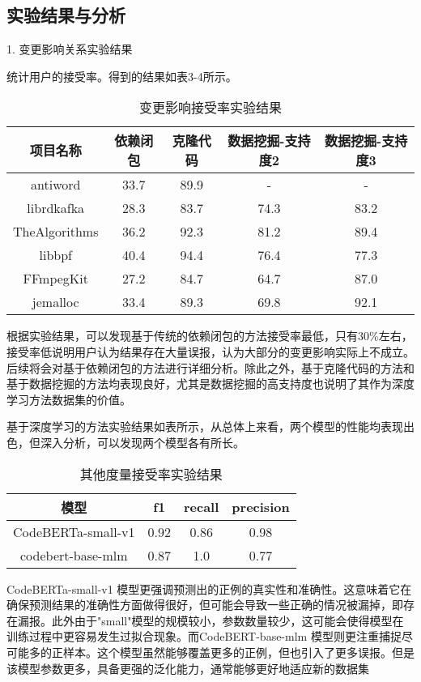 \subsection{实验结果与分析}

1. 变更影响关系实验结果

统计用户的接受率。得到的结果如表3-4所示。

\begin{table}[htbp]
\caption{变更影响接受率实验结果}
\vspace{0.5em}\centering\wuhao
\begin{tabular}{ccccc}
\toprule
项目名称 & 依赖闭包 & 克隆代码 & 数据挖掘-支持度2 & 数据挖掘-支持度3 \\
\midrule
antiword & 33.7 & 89.9 & - & -\\
librdkafka & 28.3 & 83.7 & 74.3 & 83.2\\
TheAlgorithms & 36.2 & 92.3 & 81.2 & 89.4\\
libbpf & 40.4 & 94.4 & 76.4 & 77.3\\
FFmpegKit & 27.2 & 84.7 & 64.7 & 87.0\\
jemalloc & 33.4 & 89.3 & 69.8 & 92.1\\
\bottomrule
\end{tabular}
\end{table}

根据实验结果，可以发现基于传统的依赖闭包的方法接受率最低，只有30\%左右，接受率低说明用户认为结果存在大量误报，认为大部分的变更影响实际上不成立。后续将会对基于依赖闭包的方法进行详细分析。除此之外，基于克隆代码的方法和基于数据挖掘的方法均表现良好，尤其是数据挖掘的高支持度也说明了其作为深度学习方法数据集的价值。


基于深度学习的方法实验结果如表所示，从总体上来看，两个模型的性能均表现出色，但深入分析，可以发现两个模型各有所长。

\begin{table}[htbp]
\caption{其他度量接受率实验结果}
\vspace{0.5em}\centering\wuhao
\begin{tabular}{cccc}
\toprule
模型& f1 & recall & precision \\
\midrule
CodeBERTa-small-v1 & 0.92 & 0.86 & 0.98 \\
codebert-base-mlm  & 0.87 & 1.0  & 0.77 \\
\bottomrule
\end{tabular}
\end{table}

CodeBERTa-small-v1 模型更强调预测出的正例的真实性和准确性。这意味着它在确保预测结果的准确性方面做得很好，但可能会导致一些正确的情况被漏掉，即存在漏报。此外由于"small"模型的规模较小，参数数量较少，这可能会使得模型在训练过程中更容易发生过拟合现象。而CodeBERT-base-mlm 模型则更注重捕捉尽可能多的正样本。这个模型虽然能够覆盖更多的正例，但也引入了更多误报。但是该模型参数更多，具备更强的泛化能力，通常能够更好地适应新的数据集


